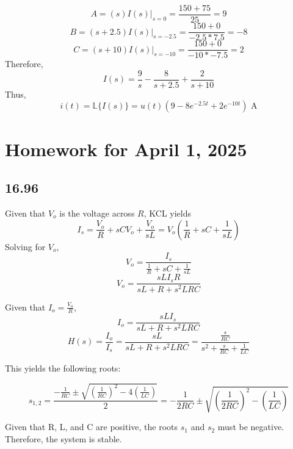 \documentclass{article}
\begin{document}
$$A=(s)I(s)|_{s=0} = \frac{150 + 75}{25} = 9$$
$$B=(s+2.5)I(s)|_{s=-2.5} = \frac{150 + 0}{-2.5 * 7.5} = -8$$
$$C = (s+10)I(s)|_{s=-10} = \frac{150 + 0}{-10 * -7.5} = 2$$
\noindent Therefore, $$I(s)=\frac9s - \frac{8}{s+2.5} + \frac{2}{s+10}$$
\noindent Thus, $$i(t) = \mathbb{L}\{I(s)\}= u(t) \left( 9 - 8e^{-2.5t} + 2e^{-10t}\right) \text{ A}$$


\section*{Homework for April 1, 2025}

\subsection*{16.96}

Given that $V_o$ is the voltage across $R$, KCL yields
$$I_s=\frac{V_o}{R} + sCV_o + \frac{V_o}{sL}=V_o \left(\frac{1}{R} + sC + \frac{1}{sL}\right)$$
Solving for $V_o$,
$$V_o=\frac{I_s}{\frac{1}{R} + sC + \frac{1}{sL}}$$
$$V_o=\frac{sLI_sR}{sL + R + s^2LRC}$$

Given that $I_o = \frac{V_o}{R}$, 
$$I_o=\frac{sLI_s}{sL + R + s^2LRC}$$
$$H(s) = \frac{I_o}{I_s}=\frac{sL}{sL + R + s^2LRC}=\frac{\frac{s}{RC}}{s^2 + \frac{s}{RC} + \frac{1}{LC}}$$

This yields the following roots:

$$s_{1,2} = \frac{-\frac{1}{RC} \pm \sqrt{\left(\frac{1}{RC}\right)^2 - 4\left(\frac{1}{LC}\right)}}{2}=-\frac{1}{2RC} \pm \sqrt{\left(\frac{1}{2RC}\right)^2 - \left(\frac{1}{LC}\right)}$$

Given that R, L, and C are positive, the roots $s_1$ and $s_2$ must be negative.
Therefore, the system is stable.
\end{document}
